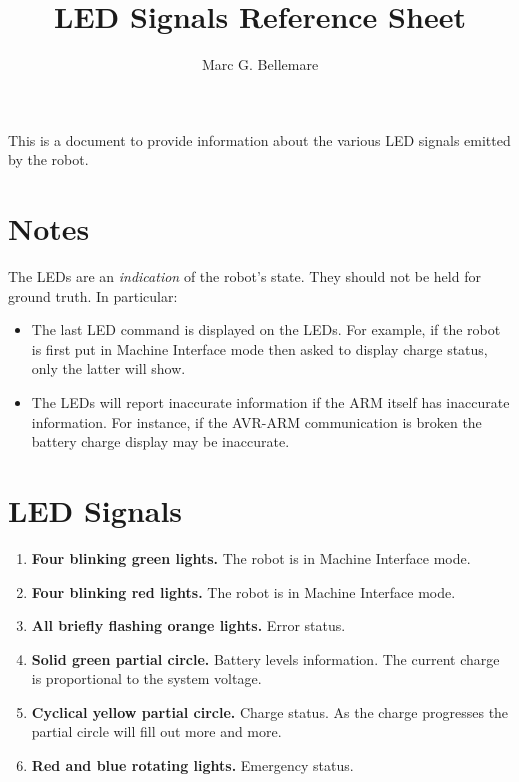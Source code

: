 \documentclass[12pt]{article}
\author{Marc G. Bellemare}
\title{LED Signals Reference Sheet}
\newcommand{\kw}[1]{{\bf #1}}
\begin{document}
\maketitle

This is a document to provide information about the various LED signals 
emitted by the robot.

\section{Notes}

The LEDs are an \emph{indication} of the robot's state. They should not be
held for ground truth. In particular:

\begin{itemize}
  \item{The last LED command is displayed on the LEDs. For example, if the robot is first put in Machine Interface mode then asked to display charge status, only the latter will show.}
  \item{The LEDs will report inaccurate information if the ARM itself has inaccurate information. For instance, if the AVR-ARM communication is broken the battery charge display may be inaccurate.}
\end{itemize}

\section{LED Signals}

\begin{enumerate}
  \item{\kw{Four blinking green lights.} The robot is in Machine Interface mode.}
  \item{\kw{Four blinking red lights.} The robot is in Machine Interface mode.}
  \item{\kw{All briefly flashing orange lights.} Error status.}
  \item{\kw{Solid green partial circle.} Battery levels information. The current charge is proportional to the system voltage.}
  \item{\kw{Cyclical yellow partial circle.} Charge status. As the charge progresses the partial circle will fill out more and more.}
  \item{\kw{Red and blue rotating lights.} Emergency status.}
\end{enumerate}
\end{document}
